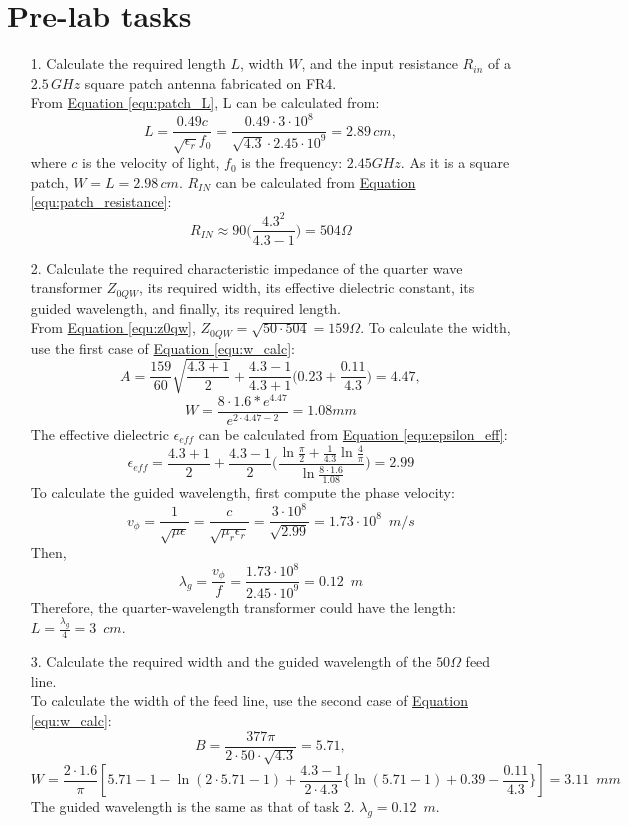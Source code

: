 \documentclass[12pt,a4paper]{report}
\begin{document}
\section{Pre-lab tasks}
\begin{itemize}
    \item[1.] Calculate the required length $L$, width $W$, and the input resistance $R_{in}$ of a $2.5 \, GHz$ square patch antenna fabricated on FR4. \\
    From \hyperref[equ:patch_L]{Equation \ref*{equ:patch_L}}, L can be calculated from: $$L = \frac{0.49c}{\sqrt{\epsilon_r}f_0} = \frac{0.49 \cdot 3 \cdot 10^8}{\sqrt{4.3} \cdot 2.45 \cdot 10^9} = 2.89 \, cm,$$ where $c$ is the velocity of light, $f_0$ is the frequency: $2.45 GHz$.
    As it is a square patch, $W = L = 2.98 \, cm$. $R_{IN}$ can be calculated from \hyperref[equ:patch_resistance]{Equation \ref*{equ:patch_resistance}}: $$R_{IN} \approx 90 \bigg(\frac{4.3^2}{4.3 - 1}\bigg) = 504 \Omega$$
    \item[2.] Calculate the required characteristic impedance of the quarter wave transformer $Z_{0QW}$, its required width, its effective dielectric constant, its guided wavelength, and finally, its required length. \\
    From \hyperref[equ:z0qw]{Equation \ref*{equ:z0qw}}, $Z_{0QW} = \sqrt{50 \cdot 504} = 159 \Omega$. To calculate the width, use the first case of \hyperref[equ:w_calc]{Equation \ref*{equ:w_calc}}: $$A = \frac{159}{60} \sqrt{\frac{4.3 + 1}{2}} + \frac{4.3 - 1}{4.3 + 1} \bigg(0.23 + \frac{0.11}{4.3}\bigg) = 4.47,$$ $$W = \frac{8 \cdot 1.6 * e^{4.47}}{e^{2 \cdot 4.47 - 2}} = 1.08 mm$$
    The effective dielectric $\epsilon_{eff}$ can be calculated from \hyperref[equ:epsilon_eff]{Equation \ref*{equ:epsilon_eff}}: $$\epsilon_{eff} = \frac{4.3 + 1}{2} + \frac{4.3 - 1}{2} \bigg(\frac{\ln \frac{\pi}{2} + \frac{1}{4.3} \ln \frac{4}{\pi}}{\ln \frac{8 \cdot 1.6}{1.08}}\bigg) = 2.99$$
    To calculate the guided wavelength, first compute the phase velocity: $$v_{\phi} = \frac{1}{\sqrt{\mu\epsilon}} = \frac{c}{\sqrt{\mu_r \epsilon_r}} = \frac{3 \cdot 10^8}{\sqrt{2.99}} = 1.73 \cdot 10^8 \enspace m/s$$
    Then, $$\lambda_g = \frac{v_\phi}{f} = \frac{1.73 \cdot 10^8}{2.45 \cdot 10^9} = 0.12 \enspace m$$
    Therefore, the quarter-wavelength transformer could have the length: $L = \frac{\lambda_g}{4} = 3 \enspace cm$.
    \item[3.] Calculate the required width and the guided wavelength of the $50 \Omega$ feed line. \\
    To calculate the width of the feed line, use the second case of \hyperref[equ:w_calc]{Equation \ref*{equ:w_calc}}:
    $$B = \frac{377\pi}{2 \cdot 50 \cdot \sqrt{4.3}} = 5.71,$$ $$W = \frac{2 \cdot 1.6}{\pi}[5.71 - 1 - \ln(2 \cdot 5.71 - 1) + \frac{4.3 - 1}{2 \cdot 4.3} \{\ln(5.71 - 1) + 0.39 - \frac{0.11}{4.3}\}] = 3.11 \enspace mm$$
    The guided wavelength is the same as that of task 2. $\lambda_g = 0.12 \enspace m$.
\end{itemize}
\end{document}
